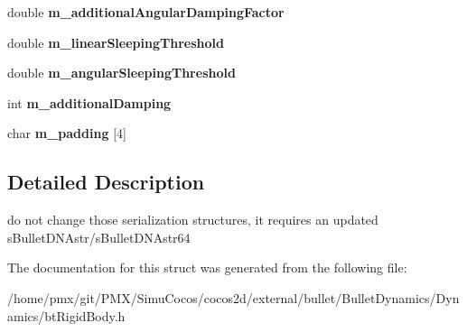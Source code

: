 \begin{DoxyCompactItemize}
double {\bfseries m\+\_\+additional\+Angular\+Damping\+Factor}
\item 
\mbox{\label{structbtRigidBodyDoubleData_ac26e360a7ac8e2adf7dd5df45251c5da}} 
double {\bfseries m\+\_\+linear\+Sleeping\+Threshold}
\item 
\mbox{\label{structbtRigidBodyDoubleData_a829fdfb504f92df1831f12cd370edaca}} 
double {\bfseries m\+\_\+angular\+Sleeping\+Threshold}
\item 
\mbox{\label{structbtRigidBodyDoubleData_acbff8b965e68814aa5f376a51f1e233c}} 
int {\bfseries m\+\_\+additional\+Damping}
\item 
\mbox{\label{structbtRigidBodyDoubleData_ab5cf1ac19be6b14d9ebb85bf90bf527d}} 
char {\bfseries m\+\_\+padding} \mbox{[}4\mbox{]}
\end{DoxyCompactItemize}


\subsection{Detailed Description}
do not change those serialization structures, it requires an updated s\+Bullet\+D\+N\+Astr/s\+Bullet\+D\+N\+Astr64 

The documentation for this struct was generated from the following file\+:\begin{DoxyCompactItemize}
\item 
/home/pmx/git/\+P\+M\+X/\+Simu\+Cocos/cocos2d/external/bullet/\+Bullet\+Dynamics/\+Dynamics/bt\+Rigid\+Body.\+h\end{DoxyCompactItemize}
